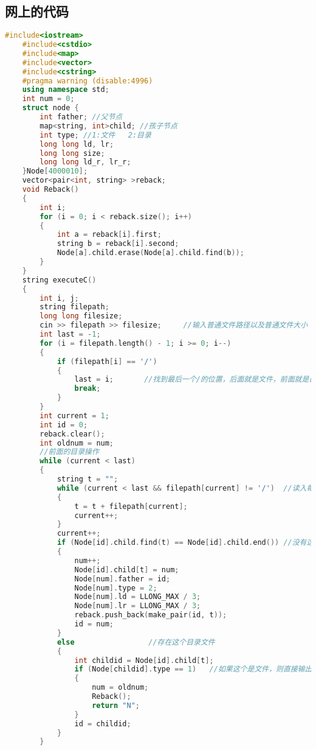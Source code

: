 \subsection{网上的代码}
\begin{lstlisting}[language=C++]
    #include<iostream>
    #include<cstdio>
    #include<map>
    #include<vector>
    #include<cstring>
    #pragma warning (disable:4996)
    using namespace std;
    int num = 0;
    struct node {
        int father; //父节点
        map<string, int>child; //孩子节点
        int type; //1:文件   2:目录
        long long ld, lr;
        long long size;
        long long ld_r, lr_r;
    }Node[4000010];
    vector<pair<int, string> >reback;
    void Reback()
    {
        int i;
        for (i = 0; i < reback.size(); i++)
        {
            int a = reback[i].first;
            string b = reback[i].second;
            Node[a].child.erase(Node[a].child.find(b));
        }
    }
    string executeC()
    {
        int i, j;
        string filepath;
        long long filesize;
        cin >> filepath >> filesize;     //输入普通文件路径以及普通文件大小
        int last = -1;
        for (i = filepath.length() - 1; i >= 0; i--)
        {
            if (filepath[i] == '/')
            {
                last = i;       //找到最后一个/的位置，后面就是文件，前面就是目录
                break;
            }
        }
        int current = 1;
        int id = 0;
        reback.clear();
        int oldnum = num; 
        //前面的目录操作
        while (current < last)
        {
            string t = "";
            while (current < last && filepath[current] != '/')  //读入每一个目录文件的名字
            {
                t = t + filepath[current];
                current++;
            }
            current++;
            if (Node[id].child.find(t) == Node[id].child.end()) //没有这个目录，那就创建一个咯
            {
                num++;
                Node[id].child[t] = num;
                Node[num].father = id;
                Node[num].type = 2;
                Node[num].ld = LLONG_MAX / 3;
                Node[num].lr = LLONG_MAX / 3;
                reback.push_back(make_pair(id, t));
                id = num;
            }
            else                 //存在这个目录文件
            {
                int childid = Node[id].child[t];
                if (Node[childid].type == 1)   //如果这个是文件，则直接输出'N'
                {
                    num = oldnum;
                    Reback();
                    return "N";
                }
                id = childid;
            }
        }
    

\end{lstlisting}
